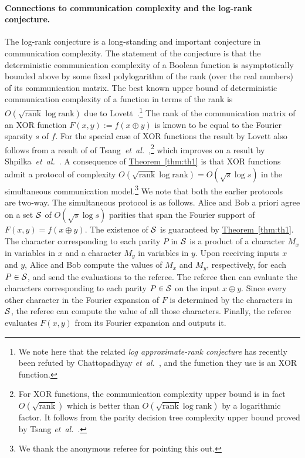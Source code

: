 \documentclass[11pt]{article}
\numberwithin{equation}{section}
\theoremstyle{definition}
\theoremstyle{plain}
\newcommand{\etal}{{\it et~al.}}
\newcommand{\lref}[2][]{\hyperref[#2]{#1~\ref*{#2}}}
\begin{document}
\paragraph{Connections to communication complexity and the log-rank
conjecture.}  %
The log-rank conjecture is a long-standing and
important conjecture in communication complexity. The statement of the
conjecture is that the deterministic communication complexity of a
Boolean function is asymptotically bounded above by some fixed
polylogarithm of the rank (over the real numbers) of its communication
matrix. The best known upper bound of deterministic communication
complexity of a function in terms of the rank is $O(\sqrt{\mbox{rank}} \log \mbox{rank})$ due to Lovett~\cite{lovett}.\footnote{We note here that the related \emph{log approximate-rank conjecture} has
%
recently been refuted by
Chattopadhyay \etal~\cite{DBLP:journals/eccc/ChattopadhyayMS18}, and
the function
%
they use   %
is an XOR function.}
The rank of the communication matrix of an XOR 
function $F(x,y):=f(x \oplus y)$ is known to be equal to the Fourier sparsity $s$ of $f$. For the special case of XOR functions the result by Lovett also follows from
%
a result of  %
of Tsang~\etal~\cite{tsang},\footnote{For
XOR functions, the communication complexity upper bound is in fact $O(\sqrt{\mbox{rank}})$ which is better than $O(\sqrt{\mbox{rank}} \log \mbox{rank})$ by a logarithmic factor. It follows from the parity decision tree complexity upper bound proved by Tsang \etal~\cite{tsang}.}
which improves on
%
a result by   %
Shpilka~\etal~\cite{DBLP:conf/innovations/ShpilkaTV14}. A consequence of \lref[Theorem]{thm:th1} is that XOR functions admit a protocol of complexity $O(\sqrt{\mbox{rank}} \log \mbox{rank})=O(\sqrt{s} \log s)$ in the simultaneous communication model.\footnote{We thank the anonymous referee for pointing this out.} We note that both the earlier protocols~\cite{lovett, tsang} are two-way. The simultaneous protocol is as follows. Alice and Bob a priori agree on a set $\cal S$
of $O(\sqrt{s} \log s)$ parities that span the Fourier support
of $F(x,y)=f(x \oplus y)$. The existence of $\cal S$ is guaranteed by \lref[Theorem]{thm:th1}. The character corresponding to each
parity $P$ in $\cal S$ is a product of a character $M_x$ in variables in $x$ and a character $M_y$ in variables in $y$.
Upon receiving inputs $x$ and $y$, Alice and Bob compute the values of $M_x$ and $M_y$, respectively, %
for each $P \in \cal S$, and send the evaluations to the referee.
The referee then can evaluate the characters corresponding to each parity $P \in \cal S$ on the input $x \oplus y$. Since every other character
in the Fourier expansion of $F$ is determined by the characters in $\cal S$, the referee can compute the value of all those characters. Finally, the referee evaluates $F(x,y)$ from its Fourier expansion and outputs it.
\end{document}
